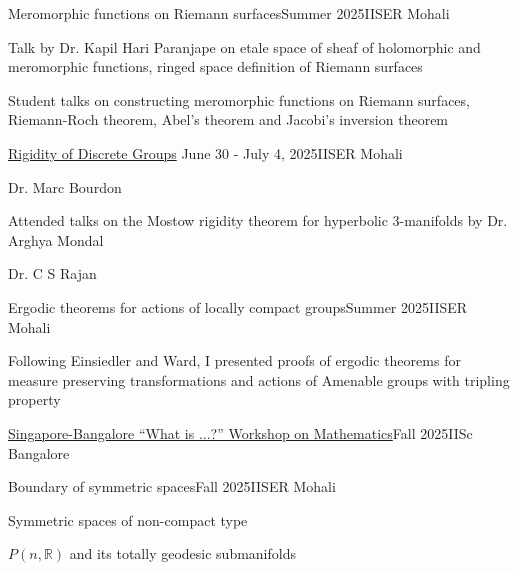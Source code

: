 \documentclass{LoLaTeXcv}
\begin{document}
\begin{lltxJob}{Meromorphic functions on Riemann surfaces}{Summer 2025}{IISER Mohali}
	\item Talk by Dr. Kapil Hari Paranjape on etale space of sheaf of holomorphic and meromorphic functions, ringed space definition of Riemann surfaces
	\item Student talks on constructing meromorphic functions on Riemann surfaces, Riemann-Roch theorem, Abel's theorem and Jacobi's inversion theorem
\end{lltxJob}

\begin{lltxJob}{
	\href{https://docs.google.com/document/d/18rjLGn7hJHEmRk-QYcSysw5hH7nbYy5A}{Rigidity of Discrete Groups}
	}{June 30 - July 4, 2025}{IISER Mohali}
	\item Dr. Marc Bourdon
	\item Attended talks on the Mostow rigidity theorem for hyperbolic 3-manifolds by Dr. Arghya Mondal
	\item Dr. C S Rajan
\end{lltxJob}

\begin{lltxJob}{Ergodic theorems for actions of locally compact groups}{Summer 2025}{IISER Mohali}
	\item Following Einsiedler and Ward, I presented proofs of ergodic theorems for measure preserving transformations and actions of Amenable groups with tripling property
\end{lltxJob}


\begin{lltsJob}{\href{https://sites.google.com/view/sgblrworkshop/home}{Singapore-Bangalore ``What is ...?'' Workshop on Mathematics}}{Fall 2025}{IISc Bangalore}
\end{lltsJob}


\begin{lltxJob}{Boundary of symmetric spaces}{Fall 2025}{IISER Mohali}
	\item Symmetric spaces of non-compact type
	\item $P(n,\mathbb{R})$ and its totally geodesic submanifolds
\end{lltxJob}
\end{document}

